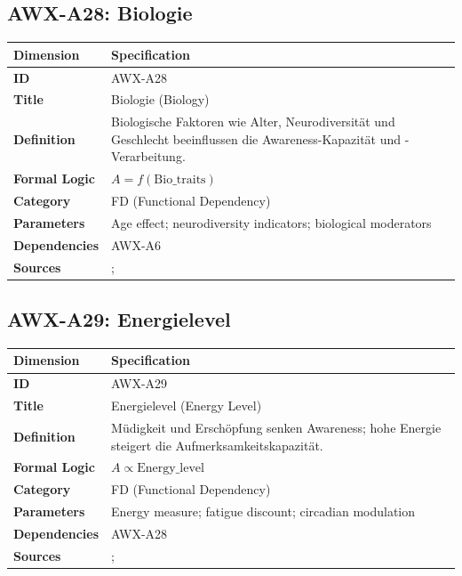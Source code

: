 
\subsection{AWX-A28: Biologie}

\begin{table}[htbp]
\small
\begin{tabular}{p{3cm}p{11cm}}
\toprule
\textbf{Dimension} & \textbf{Specification} \\
\midrule
\textbf{ID} & AWX-A28 \\
\textbf{Title} & Biologie (Biology) \\
\textbf{Definition} & Biologische Faktoren wie Alter, Neurodiversität und Geschlecht beeinflussen die Awareness-Kapazität und -Verarbeitung. \\
\textbf{Formal Logic} & $A = f(\text{Bio\_traits})$ \\
\textbf{Category} & FD (Functional Dependency) \\
\textbf{Parameters} & Age effect; neurodiversity indicators; biological moderators \\
\textbf{Dependencies} & AWX-A6 \\
\textbf{Sources} & \citet{heckman2006effects}; \citet{cunha2007technology} \\
\bottomrule
\end{tabular}
\end{table}


\subsection{AWX-A29: Energielevel}

\begin{table}[htbp]
\small
\begin{tabular}{p{3cm}p{11cm}}
\toprule
\textbf{Dimension} & \textbf{Specification} \\
\midrule
\textbf{ID} & AWX-A29 \\
\textbf{Title} & Energielevel (Energy Level) \\
\textbf{Definition} & Müdigkeit und Erschöpfung senken Awareness; hohe Energie steigert die Aufmerksamkeitskapazität. \\
\textbf{Formal Logic} & $A \propto \text{Energy\_level}$ \\
\textbf{Category} & FD (Functional Dependency) \\
\textbf{Parameters} & Energy measure; fatigue discount; circadian modulation \\
\textbf{Dependencies} & AWX-A28 \\
\textbf{Sources} & \citet{baumeister1998ego}; \citet{PAP-kahneman2003maps} \\
\bottomrule
\end{tabular}
\end{table}

